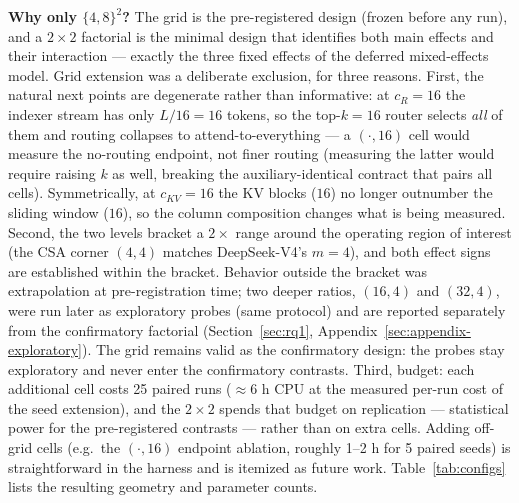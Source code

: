 \textbf{Why only $\{4,8\}^2$?} The grid is the pre-registered design (frozen
before any run), and a $2\times2$ factorial is the minimal design that
identifies both main effects and their interaction --- exactly the three
fixed effects of the deferred mixed-effects model. Grid extension was a
deliberate exclusion, for three reasons. First, the natural next points are
degenerate rather than informative: at $c_R{=}16$ the indexer stream has
only $L/16 = 16$ tokens, so the top-$k{=}16$ router selects \emph{all} of
them and routing collapses to attend-to-everything --- a $(\cdot,16)$ cell
would measure the no-routing endpoint, not finer routing (measuring the
latter would require raising $k$ as well, breaking the auxiliary-identical
contract that pairs all cells). Symmetrically, at $c_{KV}{=}16$ the KV
blocks ($16$) no longer outnumber the sliding window ($16$), so the column
composition changes what is being measured. Second, the two levels bracket
a $2\times$ range around the operating region of interest (the CSA corner
$(4,4)$ matches DeepSeek-V4's $m{=}4$), and both effect signs are
established within the bracket. Behavior outside the bracket was extrapolation
at pre-registration time; two deeper ratios, $(16,4)$ and $(32,4)$, were run later as
exploratory probes (same protocol) and are reported separately from the confirmatory
factorial (Section~\ref{sec:rq1}, Appendix~\ref{sec:appendix-exploratory}). The grid remains valid as the confirmatory design: the probes stay exploratory and never enter the confirmatory contrasts. Third, budget: each additional cell costs 25
paired runs ($\approx 6$ h CPU at the measured per-run cost of the seed
extension), and the $2\times2$ spends that budget on replication ---
statistical power for the pre-registered contrasts --- rather than on extra
cells. Adding off-grid cells (e.g.\ the $(\cdot,16)$ endpoint ablation,
roughly 1--2 h for 5 paired seeds) is straightforward in the harness and is
itemized as future work.
Table~\ref{tab:configs} lists the resulting geometry and
parameter counts.

